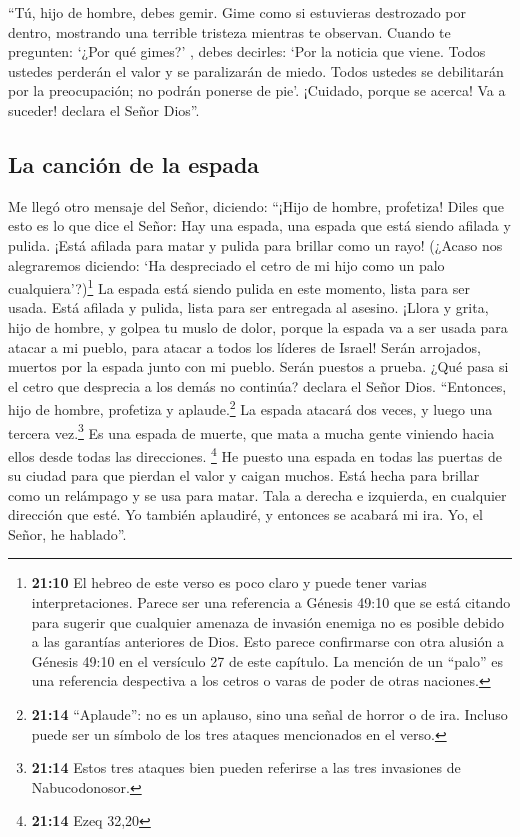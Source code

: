  ``Tú, hijo de hombre, debes gemir. Gime como si
estuvieras destrozado por dentro, mostrando una terrible tristeza
mientras te observan.  Cuando te pregunten: `¿Por qué
gimes?' , debes decirles: `Por la noticia que viene. Todos ustedes
perderán el valor y se paralizarán de miedo. Todos ustedes se
debilitarán por la preocupación; no podrán ponerse de pie'. ¡Cuidado,
porque se acerca! Va a suceder! declara el Señor Dios''.

\hypertarget{la-canciuxf3n-de-la-espada}{%
\subsection{La canción de la espada}\label{la-canciuxf3n-de-la-espada}}

 Me llegó otro mensaje del Señor, diciendo: 
``¡Hijo de hombre, profetiza! Diles que esto es lo que dice el Señor:
Hay una espada, una espada que está siendo afilada y pulida.
 ¡Está afilada para matar y pulida para brillar como un
rayo! (¿Acaso nos alegraremos diciendo: `Ha despreciado el cetro de mi
hijo como un palo cualquiera'?)\footnote{\textbf{21:10} El hebreo de
  este verso es poco claro y puede tener varias interpretaciones. Parece
  ser una referencia a Génesis 49:10 que se está citando para sugerir
  que cualquier amenaza de invasión enemiga no es posible debido a las
  garantías anteriores de Dios. Esto parece confirmarse con otra alusión
  a Génesis 49:10 en el versículo 27 de este capítulo. La mención de un
  ``palo'' es una referencia despectiva a los cetros o varas de poder de
  otras naciones.}  La espada está siendo pulida en este
momento, lista para ser usada. Está afilada y pulida, lista para ser
entregada al asesino.  ¡Llora y grita, hijo de hombre, y
golpea tu muslo de dolor, porque la espada va a ser usada para atacar a
mi pueblo, para atacar a todos los líderes de Israel! Serán arrojados,
muertos por la espada junto con mi pueblo.  Serán puestos
a prueba. ¿Qué pasa si el cetro que desprecia a los demás no continúa?
declara el Señor Dios.  ``Entonces, hijo de hombre,
profetiza y aplaude.\footnote{\textbf{21:14} ``Aplaude'': no es un
  aplauso, sino una señal de horror o de ira. Incluso puede ser un
  símbolo de los tres ataques mencionados en el verso.} La espada
atacará dos veces, y luego una tercera vez.\footnote{\textbf{21:14}
  Estos tres ataques bien pueden referirse a las tres invasiones de
  Nabucodonosor.} Es una espada de muerte, que mata a mucha gente
viniendo hacia ellos desde todas las direcciones. \footnote{\textbf{21:14}
  Ezeq 32,20}  He puesto una espada en todas las puertas
de su ciudad para que pierdan el valor y caigan muchos. Está hecha para
brillar como un relámpago y se usa para matar.  Tala a
derecha e izquierda, en cualquier dirección que esté.  Yo
también aplaudiré, y entonces se acabará mi ira. Yo, el Señor, he
hablado''.

